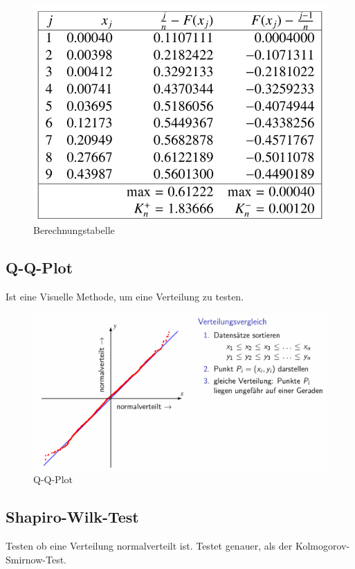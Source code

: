 \documentclass[../Main.tex]{subfiles}
\begin{document}
\begin{figure}[H]
    \centering
    \includegraphics[width=1\linewidth]{Images/kolmogorov-tabelle.png}
    \caption{Berechnungstabelle}
\end{figure}

\subsection{Q-Q-Plot}
Ist eine Visuelle Methode, um eine Verteilung zu testen.

\begin{figure}[H]
    \centering
    \includegraphics[width=1\linewidth]{Images/q-q-plot.png}
    \caption{Q-Q-Plot}
\end{figure}
\subsection{Shapiro-Wilk-Test}
Testen ob eine Verteilung normalverteilt ist.
Testet genauer, als der Kolmogorov-Smirnow-Test.
\end{document}
